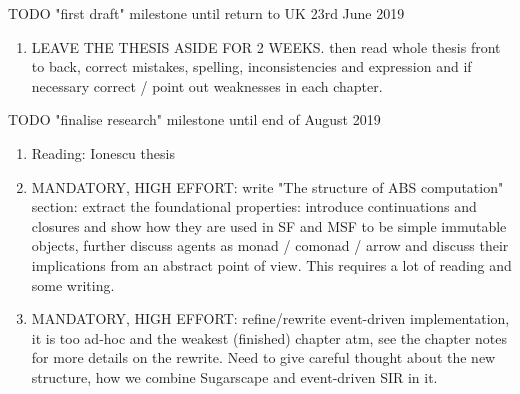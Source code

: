 \documentclass[oneside]{book}
\begin{document}

\bigskip

TODO "first draft" milestone until return to UK 23rd June 2019
\begin{enumerate}
	\item LEAVE THE THESIS ASIDE FOR 2 WEEKS. then read whole thesis front to back, correct mistakes, spelling, inconsistencies and expression and if necessary correct / point out weaknesses in each chapter.
\end{enumerate}

TODO "finalise research" milestone until end of August 2019
\begin{enumerate}
	\item Reading: Ionescu thesis

	\item MANDATORY, HIGH EFFORT: write "The structure of ABS computation" section: extract the foundational properties: introduce continuations and closures and show how they are used in SF and MSF to be simple immutable objects, further discuss agents as monad / comonad / arrow and discuss their implications from an abstract point of view. This requires a lot of reading and some writing.

	\item MANDATORY, HIGH EFFORT: refine/rewrite event-driven implementation, it is too ad-hoc and the weakest (finished) chapter atm, see the chapter notes for more details on the rewrite. Need to give careful thought about the new structure, how we combine Sugarscape and event-driven SIR in it.
	
\end{enumerate}
\end{document}

